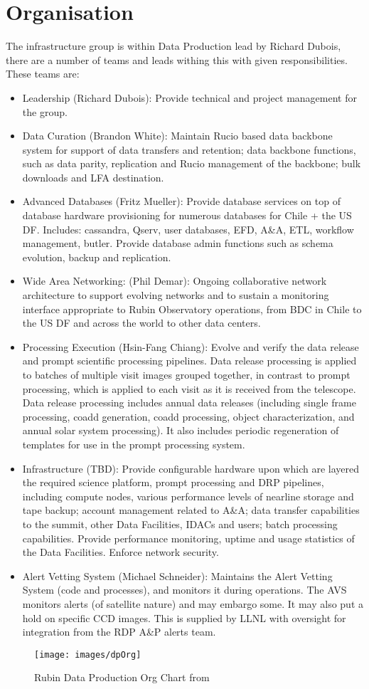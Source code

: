 \section{Organisation} \label{sec:org}

The infrastructure group is within Data Production lead by Richard Dubois, there are a number of teams and leads withing this
with given responsibilities. These teams are:
\begin{itemize}
\item Leadership (Richard Dubois): Provide technical and project management for the group.
\item {Data Curation (Brandon White): Maintain Rucio based data backbone system for support of data transfers and retention; data backbone functions, such as data parity, replication and Rucio management of the backbone; bulk downloads and LFA destination.}
\item {Advanced Databases (Fritz Mueller): Provide database services on top of database hardware provisioning for numerous databases for Chile + the US DF. Includes: cassandra, Qserv, user databases, EFD, A\&A, ETL, workflow management, butler. Provide database admin functions such as schema evolution, backup and replication.}
\item {Wide Area Networking: (Phil Demar): Ongoing collaborative network
    architecture to support evolving networks and to sustain a
    monitoring interface appropriate to Rubin Observatory operations,
    from BDC in Chile to the US DF and across the world to other data
    centers.}
  \item {Processing Execution (Hsin-Fang Chiang): Evolve and verify the data release and prompt scientific processing pipelines. Data release processing is applied to batches of multiple visit images grouped together, in contrast to prompt processing, which is applied to each visit as it is received from the telescope. Data release processing includes annual data releases (including single frame processing, coadd generation, coadd processing, object characterization, and annual solar system processing). It also includes periodic regeneration of templates for use in the prompt processing system.}
\item {Infrastructure (TBD): Provide configurable hardware upon which are layered the required science platform, prompt processing and DRP pipelines, including compute nodes, various performance levels of nearline storage and tape backup; account management related to A\&A; data transfer capabilities to the summit, other Data Facilities, IDACs and users; batch processing capabilities. Provide performance monitoring, uptime and usage statistics of the Data Facilities. Enforce network security.}
\item {Alert Vetting System (Michael Schneider): Maintains the Alert
    Vetting System (code and processes), and monitors it during
    operations. The AVS monitors alerts (of satellite nature) and may
    embargo some. It may also put a hold on specific CCD images. This
    is supplied by LLNL with oversight for integration from the RDP A\&P alerts team.}
\end{itemize}



\begin{figure}
\begin{centering}
\texttt{[image: images/dpOrg]}
	\caption{Rubin Data Production Org Chart from \cite{RTN-001}\label{fig:dporg}}
\end{centering}
\end{figure}
